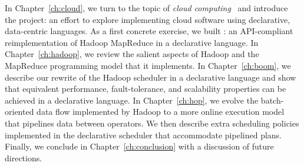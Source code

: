 In Chapter~\ref{ch:cloud}, we turn to the topic of {\em cloud
computing}~\cite{abovetheclouds} and introduce the \BOOM project: an effort to
explore implementing cloud software using declarative, data-centric languages.
As a first concrete exercise, we built \BOOMA: an API-compliant
reimplementation of Hadoop MapReduce in a declarative language.  In
Chapter~\ref{ch:hadoop}, we review the salient aspects of Hadoop and the
MapReduce programming model that it implements.  In Chapter~\ref{ch:boom}, we
describe our rewrite of the Hadoop scheduler in a declarative language and show
that equivalent performance, fault-tolerance, and scalability properties can be
achieved in a declarative language.  In Chapter~\ref{ch:hop}, we evolve the
batch-oriented data flow implemented by Hadoop to a more online execution model
that pipelines data between operators.  We then describe extra scheduling
policies implemented in the declarative scheduler that accommodate pipelined plans.
Finally, we conclude in Chapter~\ref{ch:conclusion} with a discussion of future
directions.





